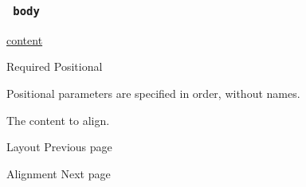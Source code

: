 \subsubsection{\texorpdfstring{\texttt{\ body\ }}{ body }}\label{parameters-body}

\href{/docs/reference/foundations/content/}{content}

{Required} {{ Positional }}

\label{parameters-body-positional-tooltip}
Positional parameters are specified in order, without names.

The content to align.

\href{/docs/reference/layout/}{\pandocbounded{}}

{ Layout } { Previous page }

\href{/docs/reference/layout/alignment/}{\pandocbounded{}}

{ Alignment } { Next page }
